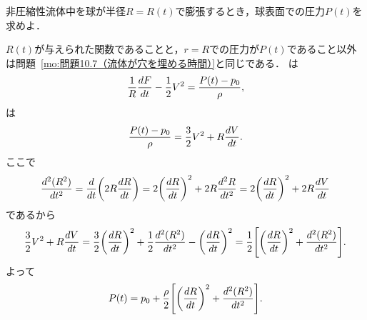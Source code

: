 
\begin{mondai}{}{}
非圧縮性流体中を球が半径$R=R(t)$で膨張するとき，球表面での圧力$P(t)$を求めよ．
\end{mondai}
\begin{kaitou}
$R(t)$が与えられた関数であることと，$r=R$での圧力が$P(t)$であること以外は問題~\ref{mo:問題10.7（流体が穴を埋める時間）}と同じである．
は
\[
    \frac{1}{R} \dv{F}{t} - \frac{1}{2} V^2 = \frac{P(t)-p_0}{\rho} , 
\]
は
\[
    \frac{P(t)-p_0}{\rho} = \frac{3}{2} V^2 + R\dv{V}{t} .
\]
ここで
\[
    \dv[2]{(R^2)}{t} = \dv{t} \pqty{ 2R\dv{R}{t} } = 2 \pqty{\dv{R}{t}}^2 + 2R \dv[2]{R}{t}
    = 2 \pqty{\dv{R}{t}}^2 + 2R \dv{V}{t}
\]
であるから
\[
    \frac{3}{2} V^2 + R\dv{V}{t}
    = \frac{3}{2} \pqty{\dv{R}{t}}^2 + \frac{1}{2}\dv[2]{(R^2)}{t} - \pqty{\dv{R}{t}}^2
    = \frac{1}{2} \bqty{ \pqty{\dv{R}{t}}^2 + \dv[2]{(R^2)}{t} }
    .
\]
よって
\[
    P(t) = p_0 + \frac{\rho}{2} \bqty{ \pqty{\dv{R}{t}}^2 + \dv[2]{(R^2)}{t} } .
\]


\end{kaitou}





